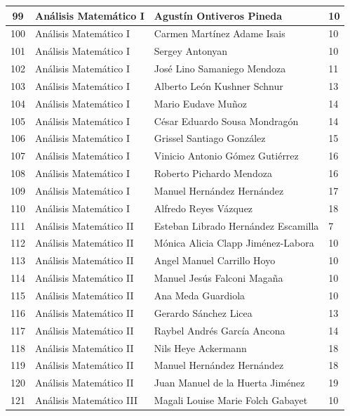 {\begin{longtable}{|c|p{6.5cm}|p{5cm}|p{1.5cm}|}
  99 & Análisis Matemático I & Agustín Ontiveros Pineda & 10 \\ \hline
  100 & Análisis Matemático I & Carmen Martínez Adame Isais & 10 \\ \hline
  101 & Análisis Matemático I & Sergey Antonyan & 10 \\ \hline
  102 & Análisis Matemático I & José Lino Samaniego Mendoza & 11 \\ \hline
  103 & Análisis Matemático I & Alberto León Kushner Schnur & 13 \\ \hline
  104 & Análisis Matemático I & Mario Eudave Muñoz & 14 \\ \hline
  105 & Análisis Matemático I & César Eduardo Sousa Mondragón & 14 \\ \hline
  106 & Análisis Matemático I & Grissel Santiago González & 15 \\ \hline
  107 & Análisis Matemático I & Vinicio Antonio Gómez Gutiérrez & 16 \\ \hline
  108 & Análisis Matemático I & Roberto Pichardo Mendoza & 16 \\ \hline
  109 & Análisis Matemático I & Manuel Hernández Hernández & 17 \\ \hline
  110 & Análisis Matemático I & Alfredo Reyes Vázquez & 18 \\ \hline
  111 & Análisis Matemático II & Esteban Librado Hernández Escamilla & 7 \\ \hline
  112 & Análisis Matemático II & Mónica Alicia Clapp Jiménez-Labora & 10 \\ \hline
  113 & Análisis Matemático II & Angel Manuel Carrillo Hoyo & 10 \\ \hline
  114 & Análisis Matemático II & Manuel Jesús Falconi Magaña & 10 \\ \hline
  115 & Análisis Matemático II & Ana Meda Guardiola & 10 \\ \hline
  116 & Análisis Matemático II & Gerardo Sánchez Licea & 13 \\ \hline
  117 & Análisis Matemático II & Raybel Andrés García Ancona & 14 \\ \hline
  118 & Análisis Matemático II & Nils Heye Ackermann & 18 \\ \hline
  119 & Análisis Matemático II & Manuel Hernández Hernández & 18 \\ \hline
  120 & Análisis Matemático II & Juan Manuel de la Huerta Jiménez & 19 \\ \hline
  121 & Análisis Matemático III & Magali Louise Marie Folch Gabayet & 10 \\ \hline

\end{longtable}}
